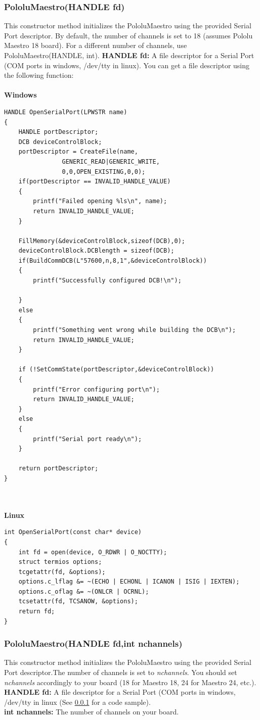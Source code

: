 \documentclass[letterpaper]{book}
\begin{document}
\subsubsection{PololuMaestro(HANDLE fd)}
\label{sec:constructor1}
This constructor method initializes the PololuMaestro using the provided Serial Port descriptor. By default, the number of channels is set to 18 (assumes Pololu Maestro 18 board). For a different number of channels, use PololuMaestro(HANDLE, int).
\textbf{HANDLE fd:} A file descriptor for a Serial Port (COM ports in windows, /dev/tty in linux). You can get a file descriptor using the following function:\\\\
\textbf{Windows}
\begin{lstlisting}
HANDLE OpenSerialPort(LPWSTR name)
{
	HANDLE portDescriptor;
	DCB deviceControlBlock;
	portDescriptor = CreateFile(name,
				GENERIC_READ|GENERIC_WRITE,
				0,0,OPEN_EXISTING,0,0);
	if(portDescriptor == INVALID_HANDLE_VALUE)
	{
		printf("Failed opening %ls\n", name);
		return INVALID_HANDLE_VALUE;
	}

	FillMemory(&deviceControlBlock,sizeof(DCB),0);
	deviceControlBlock.DCBlength = sizeof(DCB);
	if(BuildCommDCB(L"57600,n,8,1",&deviceControlBlock))
	{
		printf("Successfully configured DCB!\n");
		
	}
	else
	{
		printf("Something went wrong while building the DCB\n");
		return INVALID_HANDLE_VALUE;
	}

	if (!SetCommState(portDescriptor,&deviceControlBlock))
	{
		printf("Error configuring port\n");
		return INVALID_HANDLE_VALUE;
	}
	else
	{
		printf("Serial port ready\n");
	}
		
	return portDescriptor;
}
\end{lstlisting}
\textbf{\\\\Linux}
\begin{lstlisting}
int OpenSerialPort(const char* device)
{
	int fd = open(device, O_RDWR | O_NOCTTY);
	struct termios options;
	tcgetattr(fd, &options);
	options.c_lflag &= ~(ECHO | ECHONL | ICANON | ISIG | IEXTEN);
	options.c_oflag &= ~(ONLCR | OCRNL);
	tcsetattr(fd, TCSANOW, &options);
	return fd;
}
\end{lstlisting}
\subsubsection{PololuMaestro(HANDLE fd,int nchannels)}
This constructor method initializes the PololuMaestro using the provided Serial Port descriptor.The number of channels is set to \textit{nchannels}. You should set \textit{nchannels} accordingly to your board (18 for Maestro 18, 24 for Maestro 24, etc.).\\
\textbf{HANDLE fd:} A file descriptor for a Serial Port (COM ports in windows, /dev/tty in linux (See \ref{sec:constructor1} for a code sample).\\
\textbf{int nchannels:} The number of channels on your board.\\
\end{document}
